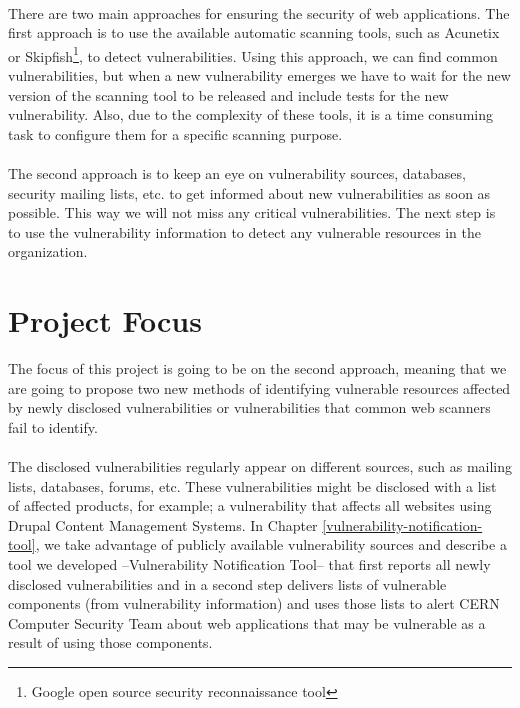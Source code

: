 \paragraph{}
There are two main approaches for ensuring the security of web applications. The first approach is to use the available automatic scanning tools, such as Acunetix or Skipfish\footnote{Google open source security reconnaissance tool}, to detect vulnerabilities. Using this approach, we can find common vulnerabilities, but when a new vulnerability emerges we have to wait for the new version of the scanning tool to be released and include tests for the new vulnerability. Also, due to the complexity of these tools, it is a time consuming task to configure them for a specific scanning purpose. 
\paragraph{}
The second approach is to keep an eye on vulnerability sources, databases, security mailing lists, etc. to get informed about new vulnerabilities as soon as possible. This way we will not miss any critical vulnerabilities. The next step is to use the vulnerability information to detect any vulnerable resources in the organization. 
\section{Project Focus}
The focus of this project is going to be on the second approach, meaning that we are going to propose two new methods of identifying vulnerable resources affected by newly disclosed vulnerabilities or vulnerabilities that common web scanners fail to identify. 
\paragraph{}
The disclosed vulnerabilities regularly appear on different sources, such as mailing lists, databases, forums, etc. These vulnerabilities might be disclosed with a list of affected products, for example; a vulnerability that affects all websites using Drupal Content Management Systems. In Chapter \ref{vulnerability-notification-tool}, we take advantage of publicly available vulnerability sources and describe a tool we developed --Vulnerability Notification Tool-- that first reports all newly disclosed vulnerabilities and in a second step delivers lists of vulnerable components (from vulnerability information) and uses those lists to alert CERN Computer Security Team about web applications that may be vulnerable as a result of using those components.
